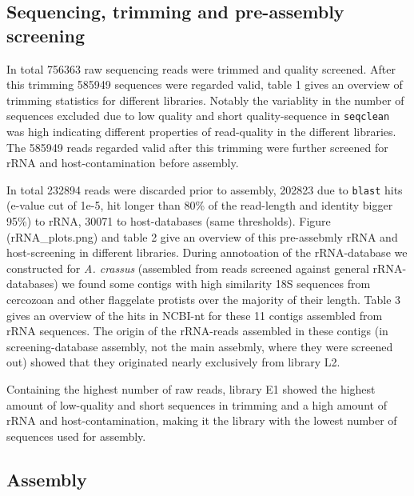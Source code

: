 \documentclass[10pt]{bmc_article}
\newenvironment{bmcformat}{\begin{raggedright}\baselineskip20pt\sloppy\setboolean{publ}{false}}{\end{raggedright}\baselineskip20pt\sloppy}
\begin{document}
\begin{bmcformat}
 \subsection*{Sequencing, trimming and pre-assembly screening}


In total 756363 raw sequencing reads were
trimmed and quality screened. After this trimming
585949 sequences were regarded valid, table 1
gives an overview of trimming statistics for different
libraries. Notably the variablity in the number of sequences excluded
due to low quality and short quality-sequence in \texttt{seqclean} was
high indicating different properties of read-quality in the different
libraries. The 585949 reads regarded valid
after this trimming were further screened for rRNA and
host-contamination before assembly.





In total 232894 reads were discarded prior to assembly,
202823 due to \texttt{blast} hits (e-value cut of 1e-5,
hit longer than 80\% of the read-length and identity bigger 95\%) to
rRNA, 30071 to host-databases (same thresholds). Figure
(rRNA\_plots.png) and table 2 give an overview of this pre-assebmly
rRNA and host-screening in different libraries. During annotoation of
the rRNA-database we constructed for \textit{A. crassus} (assembled
from reads screened against general rRNA-databases) we found some
contigs with high similarity 18S sequences from cercozoan and other
flaggelate protists over the majority of their length. Table 3 gives
an overview of the hits in NCBI-nt for these 11 contigs assembled from
rRNA sequences. The origin of the rRNA-reads assembled in these
contigs (in screening-database assembly, not the main assebmly, where
they were screened out) showed that they originated nearly exclusively
from library L2.
 
Containing the highest number of raw reads, library E1 showed the
highest amount of low-quality and short sequences in trimming and a
high amount of rRNA and host-contamination, making it the library with
the lowest number of sequences used for assembly.

\subsection*{Assembly}



\end{bmcformat}
\end{document}
